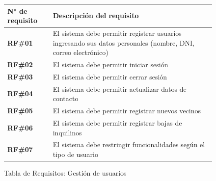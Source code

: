 \begin{figure}[H]
    \centering
    \begin{tabular}{|l|p{11cm}|}
    \hline
            \textbf{N° de requisito} 
        
        & 

            \textbf{Descripción del requisito} 
        
    \\ \hline
    
            \textbf{RF\#01} 
        
        & 

            El sistema debe permitir registrar usuarios ingresando sus datos personales (nombre, DNI, correo electrónico) 
        
    \\ \hline
    
            \textbf{RF\#02} 
        
        & 

            El sistema debe permitir iniciar sesión 
        
    \\ \hline
    
            \textbf{RF\#03} 
        
        & 

            El sistema debe permitir cerrar sesión 
        
    \\ \hline
    
            \textbf{RF\#04} 
        
        & 

            El sistema debe permitir actualizar datos de contacto 
        
    \\ \hline
    
            \textbf{RF\#05} 
        
        & 

            El sistema debe permitir registrar nuevos vecinos 
        
    \\ \hline
    
            \textbf{RF\#06} 
        
        & 

            El sistema debe permitir registrar bajas de inquilinos 
        
    \\ \hline
    
            \textbf{RF\#07} 
        
        & 

            El sistema debe restringir funcionalidades según el tipo de usuario 
        
    \\ \hline
    \end{tabular}
    \caption{Tabla de Requisitos: Gestión de usuarios}
\end{figure}

